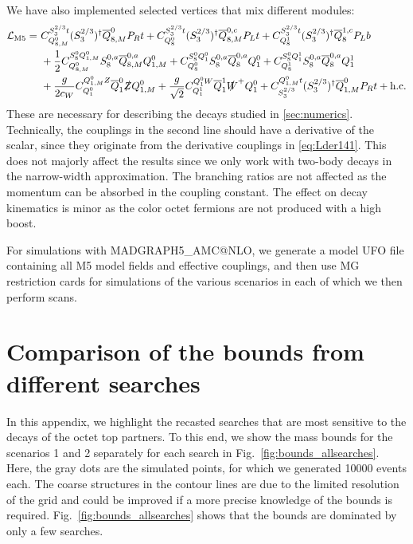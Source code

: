 \documentclass[preprintnumbers,nofootinbib,showpacs,eqsecnum,pre,12pt]{revtex4-1}
\newcommand{\adj}[1]{\overline{#1}}
\newcommand{\hc}{\text{h.c.}}
\begin{document}
We have also implemented selected vertices that mix different modules:
	\begin{align}
		\mathcal L_\mathrm{M5}= ~&C_{Q_{8,M}^0}^{S_3^{2/3}t} (S_3^{2/3})^\dagger  \adj Q^0_{8,M} P_R t + C_{Q_{8}^0}^{S_3^{2/3}t} (S_3^{2/3})^\dagger  \adj Q^{0,c}_{8,M} P_L t + C_{Q_{8}^1}^{S_3^{2/3}t} (S_3^{2/3})^\dagger  \adj Q^{1,c}_{8} P_L b \nonumber\\
		&+\frac 12 C_{Q_{8,M}^0}^{S_8^0 Q^0_{1,M}} S_8^{0,a}  \adj Q^{0,a}_{8,M} Q^0_{1,M} +C_{Q_{8}^0}^{S_8^0 Q^0_{1}} S_8^{0,a}  \adj Q^{0,a}_{8} Q^0_{1} + C_{Q_{8}^1}^{S_8^0 Q^1_{1}} S_8^{0,a}  \adj Q^{0,a}_{8} Q^1_{1} \\
		&+ \frac{g}{2 c_W} C_{Q_1^0}^{Q_{1,M}^0 Z} \adj Q_1^0 \slashed Z Q^0_{1,M} + \frac{g}{\sqrt{2}} C_{Q_1^1}^{Q_{1}^0 W} \adj Q_1^1 \slashed W^+ Q^0_{1}+ C_{S_3^{2/3}} ^{Q^0_{1,M} t} (S_3^{2/3})^\dagger \adj Q^0_{1,M} P_R t+ \hc\nonumber
	\end{align}
These are necessary for describing the decays studied in \cref{sec:numerics}.
Technically, the couplings in the second line should have a derivative of the scalar, since they originate from the derivative couplings in \cref{eq:Lder141}.
This does not majorly affect the results since we only work with two-body decays in the narrow-width approximation. The branching ratios are not affected as the momentum can be absorbed in the coupling constant. The effect on decay kinematics is minor as the color octet fermions are not produced with a high boost.

For simulations with \textsc{MADGRAPH5\_AMC@NLO}, we generate a model UFO file containing all M5 model fields and effective couplings, and then use MG restriction cards for simulations of the various scenarios in each of which we then perform scans.



\section{Comparison of the bounds from different searches}
\label{app:tools_comparison}

In this appendix, we highlight the recasted searches that are most sensitive to the decays of the octet top partners.
To this end, we show the mass bounds for the scenarios 1 and 2 separately for each search in Fig.~\ref{fig:bounds_allsearches}.
Here, the gray dots are the simulated points, for which we generated 10000 events each.
The coarse structures in the contour lines are due to the limited resolution of the grid and could be improved if a more precise knowledge of the bounds is required.
Fig.~\ref{fig:bounds_allsearches} shows that the bounds are dominated by only a few searches.
\end{document}
